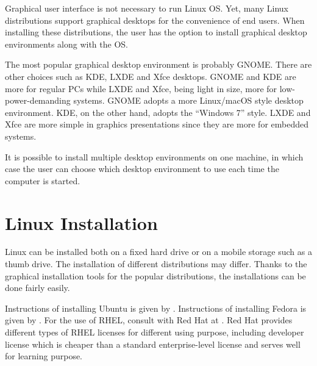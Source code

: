 Graphical user interface is not necessary to run Linux OS. Yet, many Linux distributions support graphical desktops for the convenience of end users. When installing these distributions, the user has the option to install graphical desktop environments along with the OS. 

The most popular graphical desktop environment is probably GNOME. There are other choices such as KDE, LXDE and Xfce desktops. GNOME and KDE are more for regular PCs while LXDE and Xfce, being light in size, more for low-power-demanding systems. GNOME adopts a more Linux/macOS style desktop environment. KDE, on the other hand, adopts the ``Windows 7'' style. LXDE and Xfce are more simple in graphics presentations since they are more for embedded systems.

It is possible to install multiple desktop environments on one machine, in which case the user can choose which desktop environment to use each time the computer is started.

\section{Linux Installation}

Linux can be installed both on a fixed hard drive or on a mobile storage such as a thumb drive. The installation of different distributions may differ. Thanks to the graphical installation tools for the popular distributions, the installations can be done fairly easily.

Instructions of installing Ubuntu is given by \cite{ubuntu2025ubuntu}. Instructions of installing Fedora is given by \cite{fedora2025fedora}. For the use of RHEL, consult with Red Hat at \cite{rhel2025rhel}. Red Hat provides different types of RHEL licenses for different using purpose, including developer license which is cheaper than a standard enterprise-level license and serves well for learning purpose.
